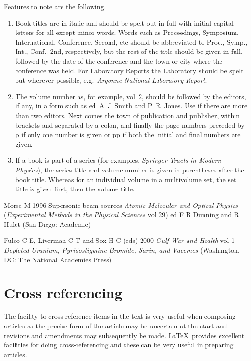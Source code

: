 \documentclass[12pt]{iopart}
\begin{document}
Features to note are the following.
\begin{enumerate}
\item Book titles are in italic and should be spelt out in full with 
initial capital letters for all except minor words. Words such as 
Proceedings, Symposium, International, Conference, Second, etc should 
be abbreviated to Proc., Symp., Int., Conf., 2nd, 
respectively, but the rest of the title should be given in full, 
followed by the date of the conference and the 
town or city where the conference was held. For 
Laboratory Reports the Laboratory should be spelt out wherever 
possible, e.g.\ {\it Argonne National Laboratory Report}.

\item The volume number as, for example, vol~2, should be followed by 
the editors, if any, in a form such as ed~A~J~Smith and P~R~Jones. Use 
\etal if there are more than two editors. Next comes the town of 
publication and publisher, within brackets and separated by a colon, 
and finally the page numbers preceded by p if only one number is given 
or pp if both the initial and final numbers are given.

\item If a book is part of a series (for examples, {\it Springer Tracts in Modern Physics\/}), the series title and volume number is given in parentheses after the book title. Whereas for an individual volume in a multivolume set, the set title is given first, then the volume title. 
\end{enumerate}
\smallskip
\begin{harvard}
\item[]Morse M 1996 Supersonic beam sources {\it Atomic Molecular and Optical Physics\/} ({\it Experimental Methods in the Physical Sciences\/} vol 29) ed F B Dunning and R Hulet (San Diego: Academic)  
\item[]Fulco C E, Liverman C T and Sox H C (eds) 2000 {\it Gulf War and Health\/} vol 1 {\it Depleted Uranium, Pyridostigmine Bromide, Sarin, and Vaccines\/} (Washington, DC: The National Academies Press)
\end{harvard}

\section{Cross referencing\label{xrefs}}
The facility to cross reference items in the text is very useful when 
composing articles as the precise form of the article may be uncertain at the start 
and  revisions and amendments may subsequently be made. 
\LaTeX\ provides excellent facilities for doing cross-referencing
and these can be very useful in preparing articles.
\end{document}
